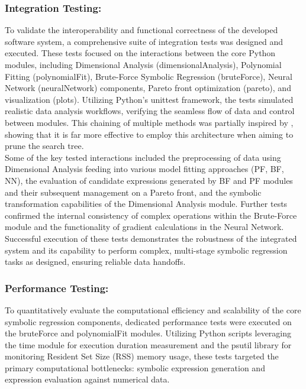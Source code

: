 \documentclass{article}
\begin{document}
\subsubsection{Integration Testing: }

To validate the interoperability and functional correctness of the developed software system, a comprehensive suite of integration tests was designed and executed. These tests focused on the interactions between the core Python modules, including Dimensional Analysis (dimensionalAnalysis), Polynomial Fitting (polynomialFit), Brute-Force Symbolic Regression (bruteForce), Neural Network (neuralNetwork) components, Pareto front optimization (pareto), and visualization (plots). Utilizing Python's unittest framework, the tests simulated realistic data analysis workflows, verifying the seamless flow of data and control between modules. This chaining of multiple methods was partially inspired by \cite{cranmer2023}, showing that it is far more effective to employ this architecture when aiming to prune the search tree.\\

Some of the key tested interactions included the preprocessing of data using Dimensional Analysis feeding into various model fitting approaches (PF, BF, NN), the evaluation of candidate expressions generated by BF and PF modules and their subsequent management on a Pareto front, and the symbolic transformation capabilities of the Dimensional Analysis module. Further tests confirmed the internal consistency of complex operations within the Brute-Force module and the functionality of gradient calculations in the Neural Network. Successful execution of these tests demonstrates the robustness of the integrated system and its capability to perform complex, multi-stage symbolic regression tasks as designed, ensuring reliable data handoffs.\\



\subsubsection{Performance Testing: }


To quantitatively evaluate the computational efficiency and scalability of the core symbolic regression components, dedicated performance tests were executed on the bruteForce and polynomialFit modules. Utilizing Python scripts leveraging the time module for execution duration measurement and the psutil library for monitoring Resident Set Size (RSS) memory usage, these tests targeted the primary computational bottlenecks: symbolic expression generation and expression evaluation against numerical data.\\
\end{document}
